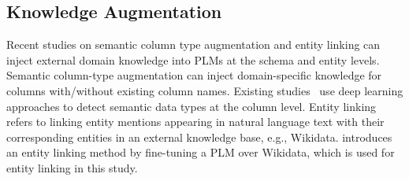 \subsection{Knowledge Augmentation}
Recent studies on semantic column type augmentation and entity linking can inject external domain knowledge into PLMs at the schema and entity levels. 
Semantic column-type augmentation can inject domain-specific knowledge for columns with/without existing column names. Existing studies~\cite{hulsebos_sherlock_2019,suhara_annotating_2022} use deep learning approaches to detect semantic data types at the column level.
Entity linking \cite{li_deep_2020} refers to linking entity mentions appearing in natural language text with their corresponding entities in an external knowledge base, e.g., Wikidata. 
\citet{ayoola_refined_2022} introduces an entity linking method by fine-tuning a PLM over Wikidata, which is used for entity linking in this study. 

